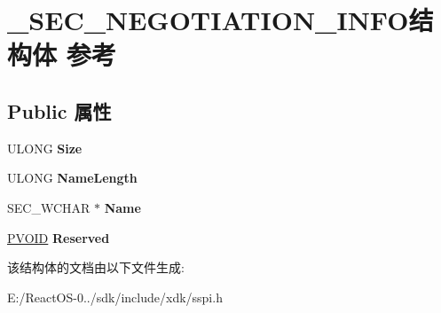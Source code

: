 \hypertarget{struct___s_e_c___n_e_g_o_t_i_a_t_i_o_n___i_n_f_o}{}\section{\+\_\+\+S\+E\+C\+\_\+\+N\+E\+G\+O\+T\+I\+A\+T\+I\+O\+N\+\_\+\+I\+N\+F\+O结构体 参考}
\label{struct___s_e_c___n_e_g_o_t_i_a_t_i_o_n___i_n_f_o}
\subsection*{Public 属性}
\begin{DoxyCompactItemize}
\item 
\mbox{\label{struct___s_e_c___n_e_g_o_t_i_a_t_i_o_n___i_n_f_o_ad38a6e9e3a16af23bce4f5342c2d2d89}} 
U\+L\+O\+NG {\bfseries Size}
\item 
\mbox{\label{struct___s_e_c___n_e_g_o_t_i_a_t_i_o_n___i_n_f_o_a6b36f5fe767ec5c13d0723d6fe39065b}} 
U\+L\+O\+NG {\bfseries Name\+Length}
\item 
\mbox{\label{struct___s_e_c___n_e_g_o_t_i_a_t_i_o_n___i_n_f_o_a1db571f05c316d265c85fdc5dbc7db06}} 
S\+E\+C\+\_\+\+W\+C\+H\+AR $\ast$ {\bfseries Name}
\item 
\mbox{\label{struct___s_e_c___n_e_g_o_t_i_a_t_i_o_n___i_n_f_o_a61356c84c24060311bfb86c6ec6329e9}} 
\hyperlink{interfacevoid}{P\+V\+O\+ID} {\bfseries Reserved}
\end{DoxyCompactItemize}


该结构体的文档由以下文件生成\+:\begin{DoxyCompactItemize}
\item 
E\+:/\+React\+O\+S-\/0../sdk/include/xdk/sspi.\+h\end{DoxyCompactItemize}
